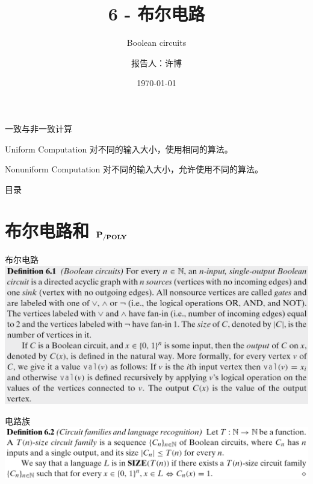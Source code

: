 \documentclass[UTF8,aspectratio=169,mathserif]{beamer}
\title{6 - 布尔电路}
\subtitle{Boolean circuits}
\author{报告人：许博}
\date{\today}
\begin{document}
	
	\begin{frame}
		\titlepage
	\end{frame}
	
	\begin{frame}{一致与非一致计算}
		\begin{block}{Uniform Computation}
			对不同的输入大小，使用相同的算法。
		\end{block}
		
		\begin{block}{Nonuniform Computation}
			对不同的输入大小，允许使用不同的算法。
		\end{block}
	\end{frame}

	\begin{frame}{目录}
		\tableofcontents
	\end{frame}

	\section{布尔电路和 $\bf P_{/POLY}$}
	\begin{frame}{布尔电路}
		\includegraphics[width=0.9\linewidth]{../../5 & 6/note.assets/image-20210427143007226.png}
	\end{frame}
	
	\begin{frame}{电路族}
		\includegraphics[width=\linewidth]{../../5 & 6/note.assets/image-20210427143311429.png}
	\end{frame}
\end{document}
